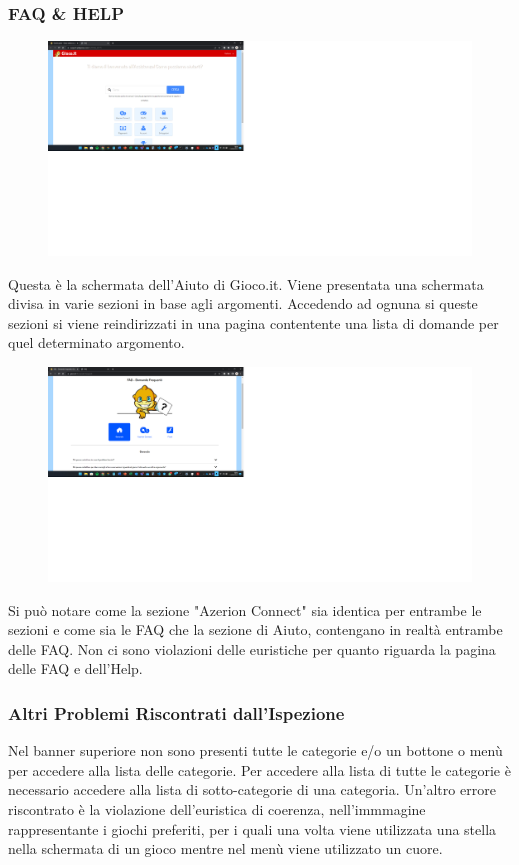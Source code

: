 \documentclass[../Report.tex]{subfiles}
\begin{document}
    \subsubsection{FAQ \& HELP}
    \begin{figure}[H]
        \includegraphics[width=\textwidth]{Assestment20.png}
        \centering
    \end{figure}
    Questa è la schermata dell'Aiuto di Gioco.it. Viene presentata una schermata divisa in varie sezioni in base agli argomenti. Accedendo ad ognuna si queste sezioni si viene reindirizzati in una pagina contentente una lista di domande per quel determinato argomento. 
    \begin{figure}[H]
        \includegraphics[width=\linewidth]{Assestment21.png}
        \centering
    \end{figure}
    Si può notare come la sezione "Azerion Connect" sia identica per entrambe le sezioni e come sia le FAQ che la sezione di Aiuto, contengano in realtà entrambe delle FAQ. Non ci sono violazioni delle euristiche per quanto riguarda la pagina delle FAQ e dell'Help.


    \subsubsection{Altri Problemi Riscontrati dall’Ispezione}
    Nel banner superiore non sono presenti tutte le categorie e/o un bottone o menù per accedere alla lista delle categorie. Per accedere alla lista di tutte le categorie è necessario accedere alla lista di sotto-categorie di una categoria. 
    Un’altro errore riscontrato è la violazione dell’euristica di coerenza, nell’immmagine rappresentante i giochi preferiti, per i quali una volta viene utilizzata una stella nella schermata di un gioco mentre nel menù viene utilizzato un cuore.
\end{document}
